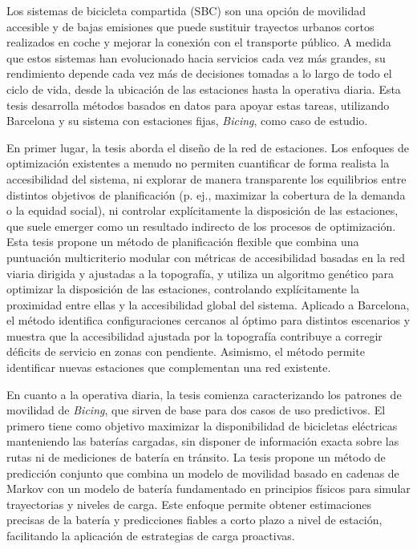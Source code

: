 \begin{spanishabstract}

Los sistemas de bicicleta compartida (SBC) son una opción de movilidad accesible y de bajas emisiones que puede sustituir trayectos urbanos cortos realizados en coche y mejorar la conexión con el transporte público. A medida que estos sistemas han evolucionado hacia servicios cada vez más grandes, su rendimiento depende cada vez más de decisiones tomadas a lo largo de todo el ciclo de vida, desde la ubicación de las estaciones hasta la operativa diaria. Esta tesis desarrolla métodos basados en datos para apoyar estas tareas, utilizando Barcelona y su sistema con estaciones fijas, \textit{Bicing}, como caso de estudio.

En primer lugar, la tesis aborda el diseño de la red de estaciones. Los enfoques de optimización existentes a menudo no permiten cuantificar de forma realista la accesibilidad del sistema, ni explorar de manera transparente los equilibrios entre distintos objetivos de planificación (p. ej., maximizar la cobertura de la demanda o la equidad social), ni controlar explícitamente la disposición de las estaciones, que suele emerger como un resultado indirecto de los procesos de optimización. Esta tesis propone un método de planificación flexible que combina una puntuación multicriterio modular con métricas de accesibilidad basadas en la red viaria dirigida y ajustadas a la topografía, y utiliza un algoritmo genético para optimizar la disposición de las estaciones, controlando explícitamente la proximidad entre ellas y la accesibilidad global del sistema. Aplicado a Barcelona, el método identifica configuraciones cercanos al óptimo para distintos escenarios y muestra que la accesibilidad ajustada por la topografía contribuye a corregir déficits de servicio en zonas con pendiente. Asimismo, el método permite identificar nuevas estaciones que complementan una red existente.

En cuanto a la operativa diaria, la tesis comienza caracterizando los patrones de movilidad de \textit{Bicing}, que sirven de base para dos casos de uso predictivos. El primero tiene como objetivo maximizar la disponibilidad de bicicletas eléctricas manteniendo las baterías cargadas, sin disponer de información exacta sobre las rutas ni de mediciones de batería en tránsito. La tesis propone un método de predicción conjunto que combina un modelo de movilidad basado en cadenas de Markov con un modelo de batería fundamentado en principios físicos para simular trayectorias y niveles de carga. Este enfoque permite obtener estimaciones precisas de la batería y predicciones fiables a corto plazo a nivel de estación, facilitando la aplicación de estrategias de carga proactivas.


\end{spanishabstract}
